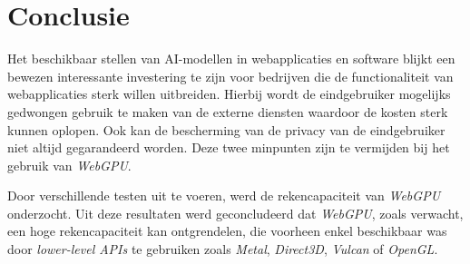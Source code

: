 
\chapter{Conclusie}%
\label{ch:conclusie}





\iffalse
TODO Samen hang moet worden verbetert, alle zaken die hier besproken zijn geweest moeten zeker aan bod zijn gekomen in het onderzoek! Al dan niet verder in detail bespreken.
\fi

Het beschikbaar stellen van AI-modellen in webapplicaties en software blijkt een bewezen interessante investering te zijn voor bedrijven die de functionaliteit van webapplicaties sterk willen uitbreiden. Hierbij wordt de eindgebruiker mogelijks gedwongen gebruik te maken van de externe diensten waardoor de kosten sterk kunnen oplopen. Ook kan de bescherming van de privacy van de eindgebruiker niet altijd gegarandeerd worden. Deze twee minpunten zijn te vermijden bij het gebruik van \textit{WebGPU}.

\bigbreak{}

Door verschillende testen uit te voeren, werd de rekencapaciteit van \textit{WebGPU} onderzocht. Uit deze resultaten werd geconcludeerd dat \textit{WebGPU}, zoals verwacht, een hoge rekencapaciteit kan ontgrendelen, die voorheen enkel beschikbaar was door \textit{lower-level APIs} te gebruiken zoals \textit{Metal}, \textit{Direct3D}, \textit{Vulcan} of \textit{OpenGL}.

